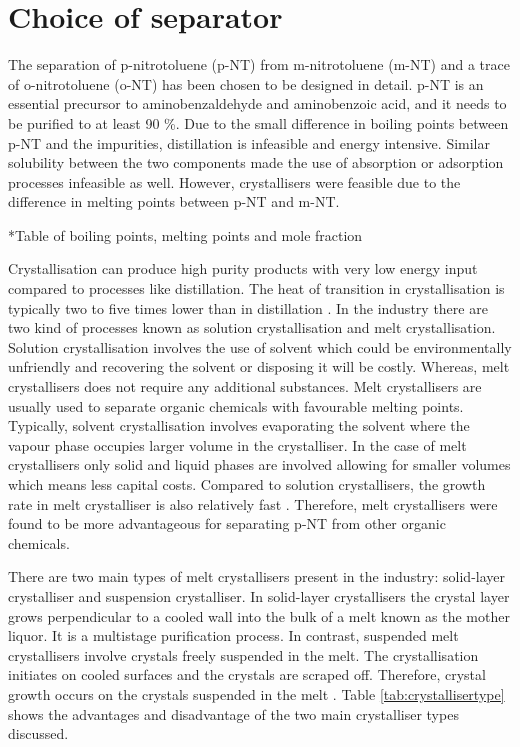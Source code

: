 \section{Choice of separator}
The separation of p-nitrotoluene (p-NT) from m-nitrotoluene (m-NT) and a trace of o-nitrotoluene (o-NT) has been chosen to be designed in detail. p-NT is an essential precursor to aminobenzaldehyde and aminobenzoic acid, and it needs to be purified to at least 90 \%. Due to the small difference in boiling points between p-NT and the impurities, distillation is infeasible and energy intensive. Similar solubility between the two components made the use of absorption or adsorption processes infeasible as well. However, crystallisers were feasible due to the difference in melting points between p-NT and m-NT.

*Table of boiling points, melting points and mole fraction 

Crystallisation can produce high purity products with very low energy input compared to processes like distillation. The heat of transition in crystallisation is typically two to five times lower than in distillation \cite{noauthor_melt_nodate}. In the industry there are two kind of processes known as solution crystallisation and melt crystallisation. Solution crystallisation involves the use of solvent which could be environmentally unfriendly and recovering the solvent or disposing it will be costly. Whereas, melt crystallisers does not require any additional substances. Melt crystallisers are usually used to separate organic chemicals with favourable melting points. Typically, solvent crystallisation involves evaporating the solvent where the vapour phase occupies larger volume in the crystalliser. In the case of melt crystallisers only solid and liquid phases are involved allowing for smaller volumes which means less capital costs. Compared to solution crystallisers, the growth rate in melt crystalliser is also relatively fast \cite{myerson_handbook_2019}. Therefore, melt crystallisers were found to be more advantageous for separating p-NT from other organic chemicals. 

There are two main types of melt crystallisers present in the industry: solid-layer crystalliser and suspension crystalliser. In solid-layer crystallisers the crystal layer grows perpendicular to a cooled wall into the bulk of a melt known as the mother liquor. It is a multistage purification process. In contrast, suspended melt crystallisers involve crystals freely suspended in the melt. The crystallisation initiates on cooled surfaces and the crystals are scraped off. Therefore, crystal growth occurs on the crystals suspended in the melt \cite{myerson_handbook_2019}. Table \ref{tab:crystallisertype} shows the advantages and disadvantage of the two main crystalliser types discussed. 


